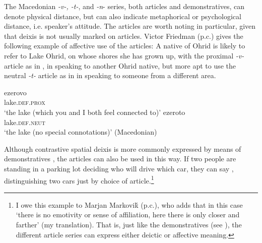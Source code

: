 \documentclass[output=paper,
colorlinks,
citecolor=brown,
newtxmath
]{langscibook}
\begin{document}
The Macedonian \textit{-v-, -t-}, and \textit{-n}- series, both articles and demonstratives, can denote physical distance, but can also indicate metaphorical or psychological distance, i.e. speaker's attitude. The articles are worth noting in particular, given that deixis is not usually marked on articles. Victor Friedman (p.c.) gives the following example of affective use of the articles: A native of Ohrid is likely to refer to Lake Ohrid, on whose shores she has grown up, with the proximal \textit{-v-} article as in , in speaking to another Ohrid native, but more apt to use the neutral \textit{-t-} article as in  in speaking to someone from a different area.

\ea\label{lake}
\ea\label{lake1}
\gll ezerovo \\
     lake.\textsc{def.prox} \\
\glt `the lake (which you and I both feel connected to)'
\ex \label{lake2}
\gll ezeroto \\
     lake.\textsc{def}.\textsc{neut} \\
\glt `the lake (no special connotations)' \hfill (Macedonian)
\z\z

\noindent Although contrastive spatial deixis is more commonly expressed by means of demonstratives \citep{Karapejovski2017}, the articles can also be used in this way. If two people are standing in a parking lot deciding who will drive which car, they can say , distinguishing two cars just by choice of article.\footnote{I owe this example to Marjan Markoviḱ (p.c.), who adds that in this case `there is no emotivity or sense of affiliation, here there is only closer and farther' (my translation). That is, just like the demonstratives (see ), the different article series can express either deictic or affective meaning.}
\end{document}
